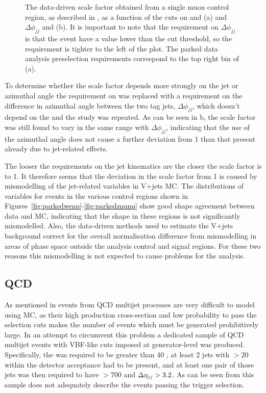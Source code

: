 \begin{figure}
  \caption{The data-driven scale factor obtained from a single muon control region, as described in , as a function of the cuts on \jetmetdphi and \Mjj (a) and $\Delta\phi_{jj}$ and \Mjj (b). It is important to note that the requirement on $\Delta\phi_{jj}$ is that the event have a value lower than the cut threshold, so the requirement is tighter to the left of the plot. The parked data analysis preselection requirements correspond to the top right bin of (a).}
  \label{fig:jetmetdphimjjscalefactor}
\end{figure}

To determine whether the scale factor depends more strongly on the jet or \METnoMU azimuthal angle the requirement on \jetmetdphi was replaced with a requirement on the difference in azimuthal angle between the two tag jets, $\Delta\phi_{jj}$, which doesn't depend on the \METnoMU and the study was repeated. As can be seen in b, the scale factor was still found to vary in the same range with $\Delta\phi_{jj}$, indicating that the use of the \METnoMU azimuthal angle does not cause a further deviation from 1 than that present already due to jet-related effects.

The looser the requirements on the jet kinematics are the closer the scale factor is to 1. It therefore seems that the deviation in the scale factor from 1 is caused by mismodelling of the jet-related variables in V+jets \ac{MC}. The distributions of variables for events in the various control regions shown in Figures~\ref{fig:parkedwenu}-\ref{fig:parkedznunu} show good shape agreement between data and \ac{MC}, indicating that the shape in these regions is not significantly mismodelled. Also, the data-driven methods used to estimate the V+jets background correct for the overall normalisation difference from mismodelling in areas of phase space outside the analysis control and signal regions. For these two reasons this mismodelling is not expected to cause problems for the analysis.

\subsection{QCD}
\label{sec:parkedQCD}
As mentioned in  events from \ac{QCD} multijet processes are very difficult to model using \ac{MC}, as their high production cross-section and low probability to pass the selection cuts makes the number of events which must be generated prohibitively large. In an attempt to circumvent this problem a dedicated sample of \ac{QCD} multijet events with \ac{VBF}-like cuts imposed at generator-level was produced. Specifically, the \MET was required to be greater than 40 \GeV, at least 2 jets with \pt$>20$ within the detector acceptance had to be present, and at least one pair of those jets was then required to have \Mjj$>700$ \GeV and $\Delta\eta_{jj}>3.2$. As can be seen from  this sample does not adequately describe the events passing the trigger selection.

